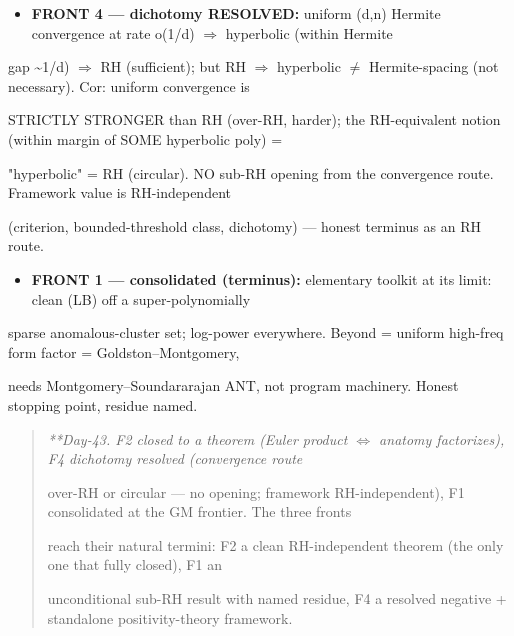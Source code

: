 \documentclass[10pt]{article}
\begin{document}
\begin{itemize}
\item \textbf{FRONT 4 --- dichotomy RESOLVED:} uniform (d,n) Hermite convergence at rate o(1/d) \ensuremath{\Rightarrow} hyperbolic (within Hermite
\end{itemize}
  gap \textasciitilde{}1/d) \ensuremath{\Rightarrow} RH (sufficient); but RH \ensuremath{\Rightarrow} hyperbolic \ensuremath{\ne} Hermite-spacing (not necessary). Cor: uniform convergence is\par
  STRICTLY STRONGER than RH (over-RH, harder); the RH-equivalent notion (within margin of SOME hyperbolic poly) =\par
  "hyperbolic" = RH (circular). NO sub-RH opening from the convergence route. Framework value is RH-independent\par
  (criterion, bounded-threshold class, dichotomy) --- honest terminus as an RH route.\par
\begin{itemize}
\item \textbf{FRONT 1 --- consolidated (terminus):} elementary toolkit at its limit: clean (LB) off a super-polynomially
\end{itemize}
  sparse anomalous-cluster set; log-power everywhere. Beyond = uniform high-freq form factor = Goldston--Montgomery,\par
  needs Montgomery--Soundararajan ANT, not program machinery. Honest stopping point, residue named.\par

\begin{quote}\itshape
**Day-43. F2 closed to a theorem (Euler product \ensuremath{\iff} anatomy factorizes), F4 dichotomy resolved (convergence route\par
over-RH or circular --- no opening; framework RH-independent), F1 consolidated at the GM frontier. The three fronts\par
reach their natural termini: F2 a clean RH-independent theorem (the only one that fully closed), F1 an\par
unconditional sub-RH result with named residue, F4 a resolved negative + standalone positivity-theory framework.\par
\end{quote}
\end{document}
